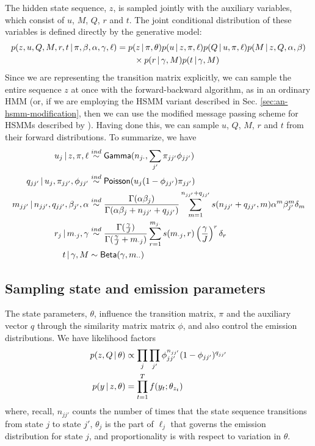 The hidden state sequence, $z$, is sampled jointly with the auxiliary
variables, which consist of $u$, $M$, $Q$, $r$ and $t$.  The joint
conditional distribution of these variables is defined directly by the
generative model:
\begin{align}
  \label{eq:19} p(z, u, Q, M, r, t \, \vert \, \pi, \beta, \alpha, \gamma,
\ell) &= p(z \, \vert \, \pi, \theta) p(u \, \vert \, z, \pi, \ell) p(Q \, \vert \,
u, \pi, \ell) p(M \, \vert \, z, Q, \alpha, \beta) \\ &\qquad \times p(r
\, \vert \, \gamma, M) p(t \, \vert \, \gamma, M)
\end{align} Since we are representing the transition matrix
explicitly, we can sample the entire sequence $z$ at once with the
forward-backward algorithm, as in an ordinary HMM (or, if we are
employing the HSMM variant described in
Sec. \ref{sec:an-hsmm-modification}, then we can use the modified
message passing scheme for HSMMs described by
\citet{johnson2013bayesian}).  Having done this, we can sample $u$,
$Q$, $M$, $r$ and $t$ from their forward distributions.  To summarize,
we have
\begin{align}
  \label{eq:48} u_j \, \vert \, z, \pi, \ell &\stackrel{ind}{\sim}
\mathsf{Gamma}(n_{j\cdot},\sum_{j'} \pi_{jj'}\phi_{jj'}) \\ q_{jj'} \, \vert \,
u_j, \pi_{jj'}, \phi_{jj'} &\stackrel{ind}{\sim} \mathsf{Poisson}(u_j(1 -
\phi_{jj'})\pi_{jj'}) \\ m_{jj'} \, \vert \, n_{jj'}, q_{jj'}, \beta_{j'},
\alpha &\stackrel{ind}{\sim}
\frac{\Gamma(\alpha\beta_j)}{\Gamma(\alpha\beta_j + n_{jj'} +
q_{jj'})}\sum_{m=1}^{n_{jj'} + q_{jj'}} s(n_{jj'} + q_{jj'}, m)
\alpha^m \beta_{j'}^m \delta_{m} \\ r_j \, \vert \, m_{\cdot j}, \gamma
&\stackrel{ind}{\sim}
\frac{\Gamma(\frac{\gamma}{J})}{\Gamma(\frac{\gamma}{J} + m_{\cdot
j})} \sum_{r=1}^{m_{j\cdot}} s(m_{\cdot j}, r)
\left(\frac{\gamma}{J}\right)^r \delta_r \\ t \, \vert \, \gamma, M &\sim
\mathsf{Beta}(\gamma,m_{\cdot\cdot})
\end{align}

\subsection{Sampling state and emission parameters}
\label{sec:sampling-eta}

The state parameters, $\theta$, influence the transition matrix, $\pi$
and the auxiliary vector $q$ through the similarity matrix matrix
$\phi$, and also control the emission distributions.  We have
likelihood factors
\begin{align}
  \label{eq:65} p(z, Q \, \vert \, \theta) &\propto \prod_{j}\prod_{j'}
\phi_{jj'}^{n_{jj'}}(1-\phi_{jj'})^{q_{jj'}} \\ p(y \, \vert \, z, \theta)
&= \prod_{t=1}^T f(y_t; \theta_{z_t})
\end{align} where, recall, $n_{jj'}$ counts the number of times that
the state sequence transitions from state $j$ to state $j'$,
$\theta_j$ is the part of $\ell_j$ that governs the emission
distribution for state $j$, and proportionality is with respect to
variation in $\theta$.

